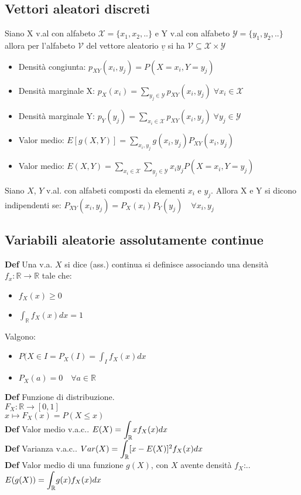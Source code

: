 \documentclass[10pt,a4paper]{article}
\begin{document}
\begin{multicols}{2}
\subsection*{Vettori aleatori discreti}
Siano X v.al con alfabeto $\mathcal{X}=\{x_1,x_2,..\}$ e Y v.al con alfabeto $ \mathcal{Y}=\{y_1,y_2,..\}$ allora per l'alfabeto $\mathcal{V}$ del vettore aleatorio $\underline{v}$ si ha $\mathcal{V}\subseteq\mathcal{X}\times\mathcal{Y}$
\begin{itemize}
\item Densità congiunta: $p_{XY}(x_i, y_j) = P(X=x_i, Y=y_j)$
\item Densità marginale X: $p_X(x_i) = \sum\limits_{y_j \in \mathcal{Y}} p_{XY}(x_i,y_j) \; \forall x_i \in \mathcal{X}$
\item Densità marginale Y: $p_Y(y_j) = \sum\limits_{x_i \in \mathcal{X}} p_{XY}(x_i,y_j) \; \forall y_j \in \mathcal{Y}$
\item Valor medio: $E[g(X, Y)] = \sum\limits_{x_i, y_j} g(x_i, y_j) P_{XY}(x_i, y_j)$
\item Valor medio: $E(X, Y) = \sum\limits_{x_i \in \mathcal{X}} \sum\limits_{y_j \in \mathcal{Y}} x_i y_j P(X=x_i,Y=y_j)$
\end{itemize}
Siano $X$, $Y$ v.al. con alfabeti composti da elementi $x_i$ e $y_j$. Allora X e Y si dicono indipendenti se: $P_{XY}(x_i, y_j) = P_X(x_i)P_Y(y_j) \quad\forall x_i, y_j$


\subsection*{Variabili aleatorie assolutamente continue}

\textbf{Def}
    Una v.a. $X$ si dice (ass.) continua si definisce associando una densit\`a $f_x : \mathbb{R}\to\mathbb{R}$ tale che:
\begin{itemize}
    \item $f_X(x) \geq 0$
    \item $\int_\mathbb{R} f_X(x) dx = 1$
\end{itemize}
Valgono:
\begin{itemize}
    \item $P(X \in I = P_X(I) = \int_I f_X(x)dx$
    \item $P_X(a) = 0\quad\forall a\in\mathbb{R}$
\end{itemize}
\textbf{Def} Funzione di distribuzione. \\  \textit{
    $F_X : \mathbb{R} \to [0, 1]$ \\
    $x \mapsto F_X(x) = P(X \leq x)$
}\\
\textbf{Def} Valor medio v.a.c.. \textit{
    $E(X) = \mathlarger{\int_\mathbb{R}} x f_X(x)dx$
}\\
\textbf{Def} Varianza v.a.c.. \textit{
    $Var(X) = \mathlarger{\int_\mathbb{R}} [x - E(X)]^2 f_X(x)dx$
}\\
\textbf{Def} Valor medio di una funzione $g(X)$, con $X$ avente densità $f_X$:.. \textit{
    $E(g(X)) = \mathlarger{\int_\mathbb{R}} g(x) f_X(x)dx$
}\\









\end{multicols}
\end{document}
